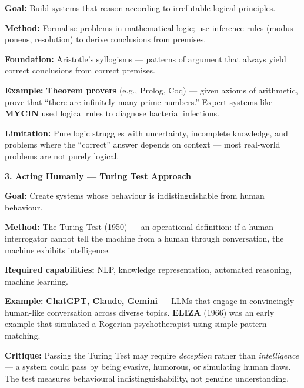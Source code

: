 \documentclass[12pt, a4paper]{article}
\begin{document}
\begin{keypoints}
  \item \textbf{Goal:} Build systems that reason according to irrefutable logical principles.
  \item \textbf{Method:} Formalise problems in mathematical logic; use inference rules (modus ponens, resolution) to derive conclusions from premises.
  \item \textbf{Foundation:} Aristotle's syllogisms — patterns of argument that always yield correct conclusions from correct premises.
  \item \textbf{Example:} \textbf{Theorem provers} (e.g., Prolog, Coq) — given axioms of arithmetic, prove that ``there are infinitely many prime numbers.'' Expert systems like \textbf{MYCIN} used logical rules to diagnose bacterial infections.
  \item \textbf{Limitation:} Pure logic struggles with uncertainty, incomplete knowledge, and problems where the ``correct'' answer depends on context — most real-world problems are not purely logical.
\end{keypoints}

\vspace{0.4em}

\noindent\textbf{3. Acting Humanly — Turing Test Approach}

\begin{keypoints}
  \item \textbf{Goal:} Create systems whose behaviour is indistinguishable from human behaviour.
  \item \textbf{Method:} The Turing Test (1950) — an operational definition: if a human interrogator cannot tell the machine from a human through conversation, the machine exhibits intelligence.
  \item \textbf{Required capabilities:} NLP, knowledge representation, automated reasoning, machine learning.
  \item \textbf{Example:} \textbf{ChatGPT, Claude, Gemini} — LLMs that engage in convincingly human-like conversation across diverse topics. \textbf{ELIZA} (1966) was an early example that simulated a Rogerian psychotherapist using simple pattern matching.
  \item \textbf{Critique:} Passing the Turing Test may require \emph{deception} rather than \emph{intelligence} — a system could pass by being evasive, humorous, or simulating human flaws. The test measures behavioural indistinguishability, not genuine understanding.
\end{keypoints}
\end{document}
